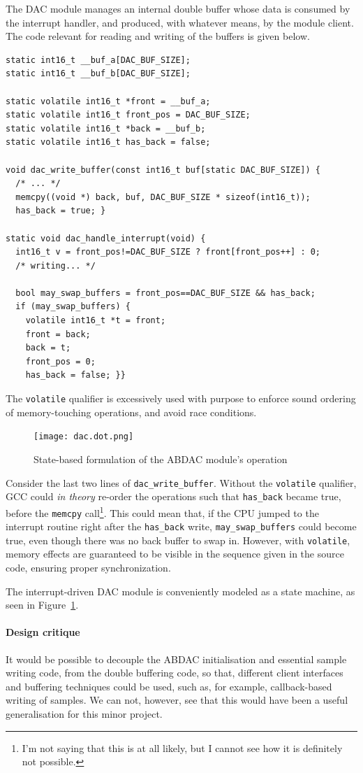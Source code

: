 \documentclass[a4paper,9pt]{article}
\newcommand{\isrc}[1]{\texttt{#1}}
\begin{document}
The DAC module manages an internal double buffer whose data
is consumed by the interrupt handler, and produced, with whatever means, by
the module client.  The code relevant for reading and writing of the buffers
is given below.

\begin{lstlisting}
static int16_t __buf_a[DAC_BUF_SIZE];
static int16_t __buf_b[DAC_BUF_SIZE];

static volatile int16_t *front = __buf_a;
static volatile int16_t front_pos = DAC_BUF_SIZE;
static volatile int16_t *back = __buf_b;
static volatile int16_t has_back = false;

void dac_write_buffer(const int16_t buf[static DAC_BUF_SIZE]) {
  /* ... */
  memcpy((void *) back, buf, DAC_BUF_SIZE * sizeof(int16_t));
  has_back = true; }

static void dac_handle_interrupt(void) {
  int16_t v = front_pos!=DAC_BUF_SIZE ? front[front_pos++] : 0;
  /* writing... */
  
  bool may_swap_buffers = front_pos==DAC_BUF_SIZE && has_back;
  if (may_swap_buffers) {
    volatile int16_t *t = front;
    front = back;
    back = t;
    front_pos = 0;
    has_back = false; }}
\end{lstlisting}
The \isrc{volatile} qualifier is excessively used with 
purpose to enforce sound ordering of memory-touching operations, and avoid
race conditions.
\begin{figure}
    \centering
    \texttt{[image: dac.dot.png]}
    \caption{State-based formulation of the ABDAC module's operation}
    \label{fig:abdac}
\end{figure}
Consider the last two lines of \isrc{dac\_write\_buffer}. Without the
\isrc{volatile} qualifier, GCC could \emph{in theory} re-order the
operations such that \isrc{has\_back} became true, before the
\isrc{memcpy} call\footnote{I'm not saying that this is at all likely, but I
cannot see how it is definitely not possible.}. This could mean that, if the
CPU jumped to the interrupt routine right after the \isrc{has\_back} write,
\isrc{may\_swap\_buffers} could become true, even though there was no back
buffer to swap in. However, with \isrc{volatile}, memory effects are
guaranteed to be visible in the sequence given in the source code, ensuring
proper synchronization.

The interrupt-driven DAC module is conveniently modeled as a state machine, as
seen in Figure~\ref{fig:abdac}.

\paragraph{Design critique}
It would be possible to decouple the ABDAC initialisation and essential sample
writing code, from the double buffering code, so that, different client
interfaces and buffering techniques could be used, such as, for example,
callback-based writing of samples. We can not, however, see that this would
have been a useful generalisation for this minor project.
\end{document}
